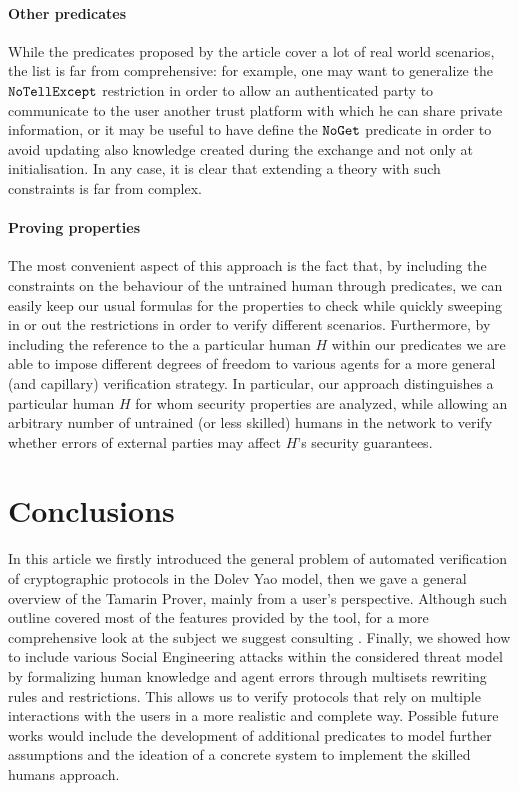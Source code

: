 \documentclass{article}
\newcommand{\mono}[1]{\textrm{\tt #1}}
\begin{document}
\paragraph{Other predicates}

While the predicates proposed by the article cover a lot of real world scenarios, the list is far from comprehensive: for example, one may want to generalize the $\mono{NoTellExcept}$ restriction in order to allow an authenticated party to communicate to the user another trust platform with which he can share private information, or it may be useful to have define the $\mono{NoGet}$ predicate in order to avoid updating also knowledge created during the exchange and not only at initialisation. In any case, it is clear that extending a theory with such constraints is far from complex.

\paragraph{Proving properties}

The most convenient aspect of this approach is the fact that, by including the constraints on the behaviour of the untrained human through predicates, we can easily keep our usual formulas for the properties to check while quickly sweeping in or out the restrictions in order to verify different scenarios. Furthermore, by including the reference to the a particular human $H$ within our predicates we are able to impose different degrees of freedom to various agents for a more general (and capillary) verification strategy. In particular, our approach distinguishes a particular human $H$ for whom security properties are analyzed, while allowing an arbitrary number of untrained (or less skilled) humans in the network to verify whether errors of external parties may affect $H$'s security guarantees.

\section{Conclusions}\label{sec:Conclusions}

In this article we firstly introduced the general problem of automated verification of cryptographic protocols in the Dolev Yao model, then we gave a general overview of the Tamarin Prover, mainly from a user's perspective. Although such outline covered most of the features provided by the tool, for a more comprehensive look at the subject we suggest consulting \cite{tamarinManual}. Finally, we showed how to include various Social Engineering attacks within the considered threat model by formalizing human knowledge and agent errors through multisets rewriting rules and restrictions. This allows us to verify protocols that rely on multiple interactions with the users in a more realistic and complete way. Possible future works would include the development of additional predicates to model further assumptions and the ideation of a concrete system to implement the skilled humans approach.



\end{document}
